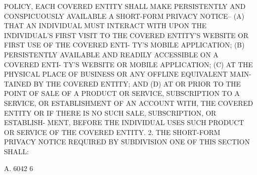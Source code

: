  POLICY, EACH COVERED ENTITY SHALL MAKE  PERSISTENTLY  AND  CONSPICUOUSLY
 AVAILABLE A SHORT-FORM PRIVACY NOTICE--
   (A)  THAT AN INDIVIDUAL MUST INTERACT WITH UPON THE INDIVIDUAL'S FIRST
 VISIT TO THE COVERED ENTITY'S WEBSITE OR FIRST USE OF THE COVERED  ENTI-
 TY'S MOBILE APPLICATION;
   (B)  PERSISTENTLY  AVAILABLE AND READILY ACCESSIBLE ON A COVERED ENTI-
 TY'S WEBSITE OR MOBILE APPLICATION;
   (C) AT THE PHYSICAL PLACE OF BUSINESS OR ANY OFFLINE EQUIVALENT  MAIN-
 TAINED BY THE COVERED ENTITY; AND
   (D)  AT  OR  PRIOR  TO  THE  POINT  OF  SALE  OF A PRODUCT OR SERVICE,
 SUBSCRIPTION TO A SERVICE, OR ESTABLISHMENT  OF  AN  ACCOUNT  WITH,  THE
 COVERED  ENTITY OR IF THERE IS NO SUCH SALE, SUBSCRIPTION, OR ESTABLISH-
 MENT, BEFORE THE INDIVIDUAL USES SUCH PRODUCT OR SERVICE OF THE  COVERED
 ENTITY.
   2.  THE  SHORT-FORM PRIVACY NOTICE REQUIRED BY SUBDIVISION ONE OF THIS
 SECTION SHALL:

 A. 6042                             6
 

